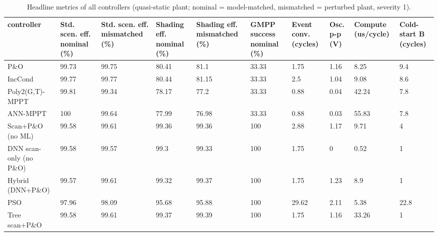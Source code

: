 \begin{table}[t]
\centering
\caption{Headline metrics of all controllers (quasi-static plant; nominal = model-matched, mismatched = perturbed plant, severity 1).}
\label{tab:Table_Headline}
\small
\begin{tabular}{llllllllll}
\hline
controller & Std. scen. eff. nominal (\%) & Std. scen. eff. mismatched (\%) & Shading eff. nominal (\%) & Shading eff. mismatched (\%) & GMPP success nominal (\%) & Event conv. (cycles) & Osc. p-p (V) & Compute (us/cycle) & Cold-start B (cycles) \\
\hline
P\&O & 99.73 & 99.75 & 80.41 & 81.1 & 33.33 & 1.75 & 1.16 & 8.25 & 9.4 \\
IncCond & 99.77 & 99.77 & 80.44 & 81.15 & 33.33 & 2.5 & 1.04 & 9.08 & 8.6 \\
Poly2(G,T)-MPPT & 99.81 & 99.34 & 78.17 & 77.2 & 33.33 & 0.88 & 0.04 & 42.24 & 7.8 \\
ANN-MPPT & 100 & 99.64 & 77.99 & 76.98 & 33.33 & 0.88 & 0.03 & 55.83 & 7.8 \\
Scan+P\&O (no ML) & 99.58 & 99.61 & 99.36 & 99.36 & 100 & 2.88 & 1.17 & 9.71 & 4 \\
DNN scan-only (no P\&O) & 99.58 & 99.57 & 99.3 & 99.33 & 100 & 1.75 & 0 & 0.52 & 1 \\
Hybrid (DNN+P\&O) & 99.57 & 99.61 & 99.32 & 99.37 & 100 & 1.75 & 1.23 & 8.9 & 1 \\
PSO & 97.96 & 98.09 & 95.68 & 95.88 & 100 & 29.62 & 2.11 & 5.38 & 22.8 \\
Tree scan+P\&O & 99.58 & 99.61 & 99.37 & 99.39 & 100 & 1.75 & 1.16 & 33.26 & 1 \\
\hline
\end{tabular}
\end{table}
